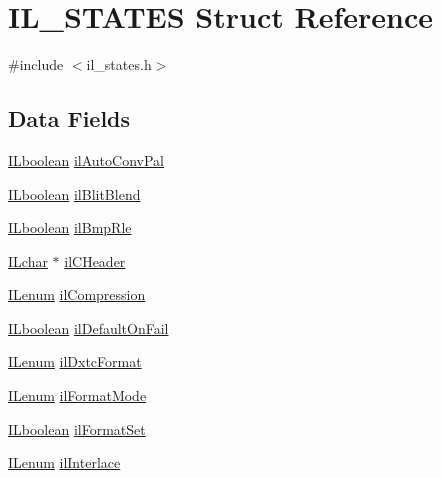 \hypertarget{struct_i_l___s_t_a_t_e_s}{\section{I\-L\-\_\-\-S\-T\-A\-T\-E\-S Struct Reference}
\label{struct_i_l___s_t_a_t_e_s}
}


{\ttfamily \#include $<$il\-\_\-states.\-h$>$}

\subsection*{Data Fields}
\begin{DoxyCompactItemize}
\item 
\hyperlink{il_8h_a8be80d75c2c636b9f2250fe10c2e7874}{I\-Lboolean} \hyperlink{struct_i_l___s_t_a_t_e_s_a7f8ab0ea01b4abe7151bf93ec2ac4342}{il\-Auto\-Conv\-Pal}
\item 
\hyperlink{il_8h_a8be80d75c2c636b9f2250fe10c2e7874}{I\-Lboolean} \hyperlink{struct_i_l___s_t_a_t_e_s_a38942e8ab4142cb192f8f2f1ccbd79e1}{il\-Blit\-Blend}
\item 
\hyperlink{il_8h_a8be80d75c2c636b9f2250fe10c2e7874}{I\-Lboolean} \hyperlink{struct_i_l___s_t_a_t_e_s_a650dd5d6636b0f606a877ef3f6baf4d0}{il\-Bmp\-Rle}
\item 
\hyperlink{il_8h_a6623f24b0ea9830b8b95942ea768412e}{I\-Lchar} $\ast$ \hyperlink{struct_i_l___s_t_a_t_e_s_a4bde329692c8940a8efc032c9b6fa2c3}{il\-C\-Header}
\item 
\hyperlink{il_8h_a1542f3a70c0c5370a30a1fa5ce349e2d}{I\-Lenum} \hyperlink{struct_i_l___s_t_a_t_e_s_ac8af69f15107752f98c0133f336f5289}{il\-Compression}
\item 
\hyperlink{il_8h_a8be80d75c2c636b9f2250fe10c2e7874}{I\-Lboolean} \hyperlink{struct_i_l___s_t_a_t_e_s_ae4d3a02d96ee0f87f6b8410baaf0b98f}{il\-Default\-On\-Fail}
\item 
\hyperlink{il_8h_a1542f3a70c0c5370a30a1fa5ce349e2d}{I\-Lenum} \hyperlink{struct_i_l___s_t_a_t_e_s_a741dcb6f1ff52560de46f048a7bd7fc2}{il\-Dxtc\-Format}
\item 
\hyperlink{il_8h_a1542f3a70c0c5370a30a1fa5ce349e2d}{I\-Lenum} \hyperlink{struct_i_l___s_t_a_t_e_s_ac4e829a5c7b0f5ac810943472967211d}{il\-Format\-Mode}
\item 
\hyperlink{il_8h_a8be80d75c2c636b9f2250fe10c2e7874}{I\-Lboolean} \hyperlink{struct_i_l___s_t_a_t_e_s_a173047652e855ff5555415dee4351a53}{il\-Format\-Set}
\item 
\hyperlink{il_8h_a1542f3a70c0c5370a30a1fa5ce349e2d}{I\-Lenum} \hyperlink{struct_i_l___s_t_a_t_e_s_a240e8e9b2780e0a5fe7bf9ac661e3fc2}{il\-Interlace}

\end{DoxyCompactItemize}
